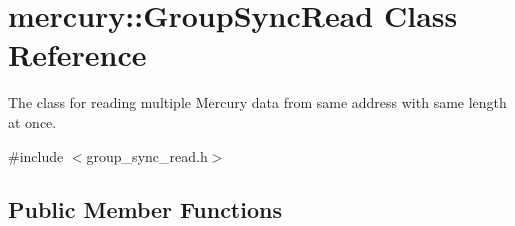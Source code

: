 \hypertarget{classmercury_1_1_group_sync_read}{}\section{mercury\+:\+:Group\+Sync\+Read Class Reference}
\label{classmercury_1_1_group_sync_read}


The class for reading multiple Mercury data from same address with same length at once.  




{\ttfamily \#include $<$group\+\_\+sync\+\_\+read.\+h$>$}

\subsection*{Public Member Functions}
